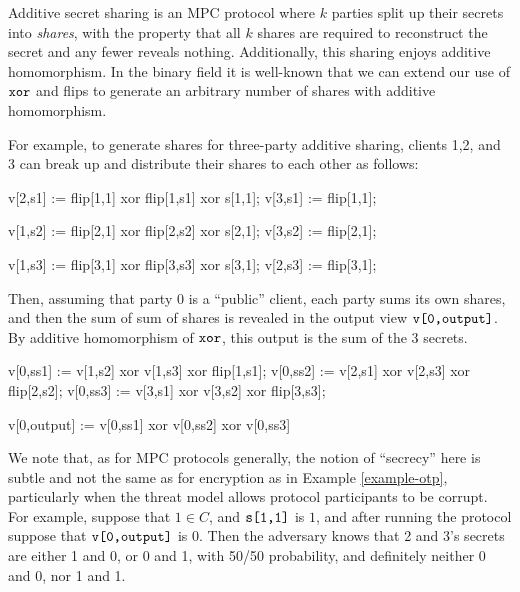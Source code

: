 \begin{example}
    \label{example-he}
Additive secret sharing is an MPC protocol where $k$ parties split up
their secrets into \emph{shares}, with the property that all $k$
shares are required to reconstruct the secret and any fewer reveals
nothing. Additionally, this sharing enjoys additive homomorphism. In
the binary field it is well-known that we can extend our use
of $\texttt{xor}$ and flips to generate an arbitrary number of shares
with additive homomorphism. 

For example, to generate shares for three-party additive sharing,
clients 1,2, and 3 can break up and distribute their shares to
each other as follows:
\begin{verbatimtab}
  v[2,s1] := flip[1,1] xor flip[1,s1] xor s[1,1];
  v[3,s1] := flip[1,1];

  v[1,s2] := flip[2,1] xor flip[2,s2] xor s[2,1];
  v[3,s2] := flip[2,1];

  v[1,s3] := flip[3,1] xor flip[3,s3] xor s[3,1];
  v[2,s3] := flip[3,1];
\end{verbatimtab}
Then, assuming that party 0 is a ``public'' client, each party sums
its own shares, and then the sum of sum of shares is revealed
in the output view $\texttt{v[0,output]}$. By additive homomorphism of
$\texttt{xor}$, this output is the sum of the 3 secrets.
\begin{verbatimtab}
  v[0,ss1] := v[1,s2] xor v[1,s3] xor flip[1,s1];
  v[0,ss2] := v[2,s1] xor v[2,s3] xor flip[2,s2];
  v[0,ss3] := v[3,s1] xor v[3,s2] xor flip[3,s3];

  v[0,output] := v[0,ss1] xor v[0,ss2] xor v[0,ss3]
\end{verbatimtab}
We note that, as for MPC protocols generally, the notion of
``secrecy'' here is subtle and not the same as for encryption as in
Example \ref{example-otp}, particularly when the threat model allows
protocol participants to be corrupt. For example, suppose that $1 \in C$, and
$\texttt{s[1,1]}$ is $1$, and after running the protocol suppose that
$\texttt{v[0,output]}$ is 0. Then the adversary knows that 2 and 3's secrets
are either 1 and 0, or 0 and 1, with 50/50 probability, and definitely
neither 0 and 0, nor 1 and 1. 
\end{example}
